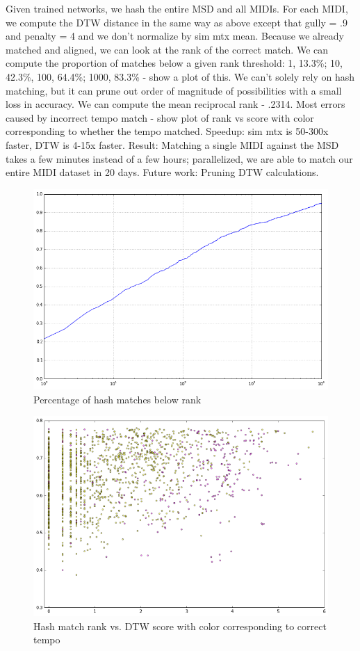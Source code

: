 \documentclass{article}
\begin{document}
Given trained networks, we hash the entire MSD and all MIDIs.
For each MIDI, we compute the DTW distance in the same way as above except that gully = .9 and penalty = 4 and we don't normalize by sim mtx mean.
Because we already matched and aligned, we can look at the rank of the correct match.
We can compute the proportion of matches below a given rank threshold: 1, 13.3\%; 10, 42.3\%, 100, 64.4\%; 1000, 83.3\% - show a plot of this.
We can't solely rely on hash matching, but it can prune out order of magnitude of possibilities with a small loss in accuracy.
We can compute the mean reciprocal rank - .2314.
Most errors caused by incorrect tempo match - show plot of rank vs score with color corresponding to whether the tempo matched.
Speedup: sim mtx is 50-300x faster, DTW is 4-15x faster.
Result: Matching a single MIDI against the MSD takes a few minutes instead of a few hours; parallelized, we are able to match our entire MIDI dataset in 20 days.
Future work: Pruning DTW calculations.

\begin{figure}[h!]
  \label{fig:percent_below_rank}
  \centering
    \includegraphics[width=\columnwidth]{percent_below_rank.png}
  \caption{Percentage of hash matches below rank}
\end{figure}

\begin{figure}[h!]
  \label{fig:rank_vs_score}
  \centering
    \includegraphics[width=\columnwidth]{rank_vs_score.png}
  \caption{Hash match rank vs. DTW score with color corresponding to correct tempo}
\end{figure}


\end{document}
